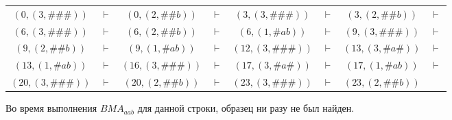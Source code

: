 \documentclass[10pt]{article}
\begin{document}
\smallskip

\noindent
\begin{tabular}{cccccccc}
  $(0, (3, \#\#\#))$ & $\vdash$ & $(0, (2, \#\#b))$ & $\vdash$ & $(3, (3, \#\#\#))$ & $\vdash$ & $(3, (2, \#\#b))$ & $\vdash$ \\
  $(6, (3, \#\#\#))$ & $\vdash$ & $(6, (2, \#\#b))$ & $\vdash$ & $(6, (1, \#ab))$ & $\vdash$ & $(9, (3, \#\#\#))$ & $\vdash$ \\
  $(9, (2, \#\#b))$ & $\vdash$ & $(9, (1, \#ab))$ & $\vdash$ & $(12, (3, \#\#\#))$ & $\vdash$ & $(13, (3, \#a\#))$ & $\vdash$ \\
  $(13, (1, \#ab))$ & $\vdash$ & $(16, (3, \#\#\#))$ & $\vdash$ & $(17, (3, \#a\#))$ & $\vdash$ & $(17, (1, \#ab))$ & $\vdash$ \\
  $(20, (3, \#\#\#))$ & $\vdash$ & $(20, (2, \#\#b))$ & $\vdash$ & $(23, (3, \#\#\#))$ & $\vdash$ & $(23, (2, \#\#b))$
\end{tabular}

\smallskip

Во время выполнения $BMA_{aab}$ для данной строки, образец ни разу не был найден.
\end{document}
